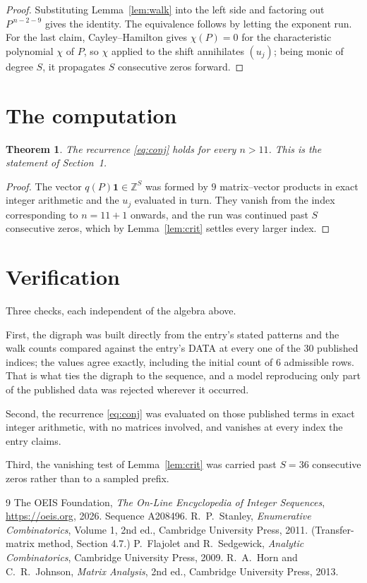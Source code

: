 \documentclass[11pt,a4paper]{article}
\theoremstyle{plain}
\newtheorem{theorem}{Theorem}
\theoremstyle{definition}
\begin{document}
\begin{proof}
Substituting Lemma~\ref{lem:walk} into the left side and factoring out
$P^{\,n-2-9}$ gives the identity. The equivalence follows by letting the exponent
run. For the last claim, Cayley--Hamilton gives $\chi(P)=0$ for the characteristic
polynomial $\chi$ of $P$, so $\chi$ applied to the shift annihilates $(u_j)$; being monic of
degree $S$, it propagates $S$ consecutive zeros forward.
\end{proof}

\section{The computation}

\begin{theorem}
The recurrence \eqref{eq:conj} holds for every $n>11$. This is the statement of
Section~1.
\end{theorem}

\begin{proof}
The vector $q(P)\mathbf{1}\in\mathbb{Z}^{S}$ was formed by $9$ matrix--vector
products in exact integer arithmetic and the $u_j$ evaluated in turn. They vanish from the
index corresponding to $n=11+1$ onwards, and the run was continued past $S$ consecutive
zeros, which by Lemma~\ref{lem:crit} settles every larger index.
\end{proof}

\section{Verification}

Three checks, each independent of the algebra above.

First, the digraph was built directly from the entry's stated patterns and the walk counts
compared against the entry's DATA at every one of the $30$ published indices; the
values agree exactly, including the initial count of $6$ admissible rows. That is
what ties the digraph to the sequence, and a model reproducing only part of the published
data was rejected wherever it occurred.

Second, the recurrence \eqref{eq:conj} was evaluated on those published terms in exact
integer arithmetic, with no matrices involved, and vanishes at every index the entry claims.

Third, the vanishing test of Lemma~\ref{lem:crit} was carried past $S=36$ consecutive
zeros rather than to a sampled prefix.

\begin{thebibliography}{9}
 The OEIS Foundation, \emph{The On-Line Encyclopedia of Integer
Sequences}, \url{https://oeis.org}, 2026. Sequence A208496.
 R.~P.~Stanley, \emph{Enumerative Combinatorics}, Volume 1, 2nd ed.,
Cambridge University Press, 2011. (Transfer-matrix method, Section 4.7.)
 P.~Flajolet and R.~Sedgewick, \emph{Analytic Combinatorics}, Cambridge
University Press, 2009.
 R.~A.~Horn and C.~R.~Johnson, \emph{Matrix Analysis}, 2nd ed., Cambridge
University Press, 2013.
\end{thebibliography}
\end{document}
